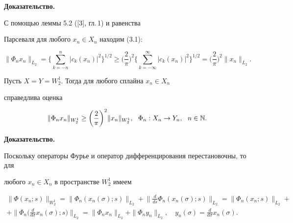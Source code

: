 {\bf Доказательство.}


С помощью леммы 5.2 ([3], гл.\,1) и равенства


Парсеваля для любого $x_n \in X_n$ находим (3.1):


$$


\|\Phi_n x_n\|_{L_2}=\bigg\{ \sum_{k=-n}^{n}


|c_k (x_n)|^2 \bigg\}^{1/2} \ge


\bigg(\frac{2}{\pi} \bigg)^2 \bigg\{ \sum_{k=-\infty}^{\infty}


|c_k (x_n)|^2 \bigg\}^{1/2}


=\bigg( \frac{2}{\pi} \bigg)^2 \|x_n\|_{L_2}.


$$





\begin{lem}


Пусть $X=Y=W_2^1$. Тогда для любого сплайна $x_n \in X_n$


справедлива оценка


$$


\|\Phi_{n}x_{n}\|_{W_{2}^{1}} \ge \bigg(\frac{2}{\pi} \bigg)^2


\|x_n\|_{W_{2}^{1}},


\ \ \Phi_n:X_n\to Y_n, \ \ n \in \N.


$$


\end{lem}





{\bf Доказательство.}


Поскольку операторы Фурье и оператор дифференцирования перестановочны, то для


любого $x_n \in X_n$ в пространстве $W_{2}^{1}$ имеем


\begin{multline}


\|\Phi(x_n;s)\|_{W_{2}^{1}}=\|\Phi_{n}(x_{n}(\sigma);s)\|_{L_2}+


\bigg\|\frac{d}{ds}\Phi_{n}(x_{n}(\sigma);s) \bigg\|_{L_2}=


\|\Phi_{n}(x_n ;s) \|_{L_2}+ \\


%


+\|\Phi_{n}


\bigg(\frac{d}{d\sigma}x_{n} (\sigma);s\bigg)\|_{L_2}=


\|\Phi_{n}x_{n}\|_{L_2}+\|\Phi_{n}y_{n}\|_{L_2},


\quad y_{n}(\sigma)=\frac{d}{d\sigma}x_n (\sigma).


\end{multline}


